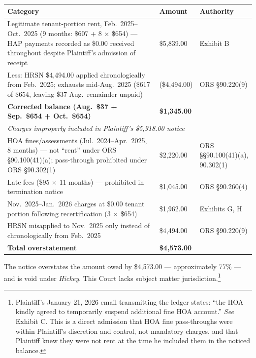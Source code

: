 \documentclass[12pt,letterpaper]{article}
\begin{document}
	\vspace{6pt}
	\begin{singlespace}
		\noindent\begin{longtable}{|p{3.2in}|p{0.9in}|p{1.5in}|}
			\hline
			\textbf{Category} & \textbf{Amount} & \textbf{Authority} \\
			\hline
			Legitimate tenant-portion rent, Feb.\ 2025--Oct.\ 2025 (9 months: \$607 + 8 $\times$ \$654) --- HAP payments recorded as \$0.00 received throughout despite Plaintiff's admission of receipt & \$5,839.00 & Exhibit B \\
			\hline
			Less: HRSN \$4,494.00 applied chronologically from Feb.\ 2025; exhausts mid-Aug.\ 2025 (\$617 of \$654, leaving \$37 Aug.\ remainder unpaid) & (\$4,494.00) & ORS \S90.220(9) \\
			\hline
			\textbf{Corrected balance (Aug.\ \$37 + Sep.\ \$654 + Oct.\ \$654)} & \textbf{\$1,345.00} & \\
			\hline
			\multicolumn{3}{|l|}{\textit{Charges improperly included in Plaintiff's \$5,918.00 notice}} \\
			\hline
			HOA fines/assessments (Jul.\ 2024--Apr.\ 2025, 8 months) --- not ``rent'' under ORS \S90.100(41)(a); pass-through prohibited under ORS \S90.302(1) & \$2,220.00 & ORS \S\S90.100(41)(a), 90.302(1) \\
			\hline
			Late fees (\$95 $\times$ 11 months) --- prohibited in termination notice & \$1,045.00 & ORS \S90.260(4) \\
			\hline
			Nov.\ 2025--Jan.\ 2026 charges at \$0.00 tenant portion following recertification (3 $\times$ \$654) & \$1,962.00 & Exhibits G, H \\
			\hline
			HRSN misapplied to Nov.\ 2025 only instead of chronologically from Feb.\ 2025 & \$4,494.00 & ORS \S90.220(9) \\
			\hline
			\textbf{Total overstatement} & \textbf{\$4,573.00} & \\
			\hline
		\end{longtable}
	\end{singlespace}
	
	The notice overstates the amount owed by \$4,573.00 --- approximately 77\% --- and is void under \textit{Hickey}. This Court lacks subject matter jurisdiction.\footnote{Plaintiff's January 21, 2026 email transmitting the ledger states: ``the HOA kindly agreed to temporarily suspend additional fine HOA account.'' \textit{See} Exhibit C. This is a direct admission that HOA fine pass-throughs were within Plaintiff's discretion and control, not mandatory charges, and that Plaintiff knew they were not rent at the time he included them in the noticed balance.}
	
\end{document}
